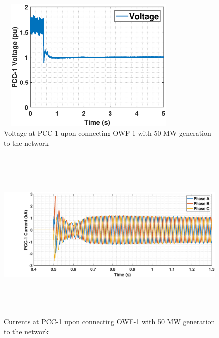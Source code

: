 \begin{figure}[H]
\centering
    \includegraphics[height = 6.5cm,width = 9cm]{Diagrams/Chapter_5/VACP_WT1_WT1connect.eps}
    \caption{Voltage at PCC-1 upon connecting OWF-1 with 50 MW generation to the network}
    \label{VACP_WT1_WT1connect}
\end{figure}

\begin{figure}[H]
\hspace*{-1.2cm}
    \includegraphics[height = 8.5cm,width = 19.5cm]{Diagrams/Chapter_5/IABC_WT1_WT1connect.eps}
    \caption{Currents at PCC-1 upon connecting OWF-1 with 50 MW generation to the network}
    \label{IABC_WT1_WT1connect}
\end{figure}

